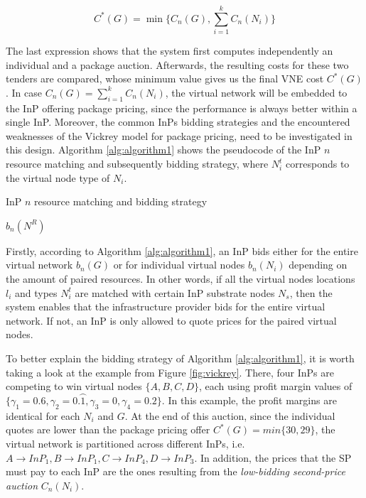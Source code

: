   \begin{equation} \label{eq:Cmcost}
        	C^{*}(G) = \min\{C_n(G), \sum_{i=1}^{k} C_n(N_i)\}
  \end{equation}

The last expression shows that the system first computes independently an individual and a package auction. Afterwards, the resulting costs for these two tenders are compared, whose minimum value gives us the final VNE cost $C^{*}(G)$. In case $C_n(G) = \sum_{i=1}^{k} C_n(N_i)$, the virtual network will be embedded to the InP offering package pricing, since the performance is always better within a single InP. Moreover, the common InPs bidding strategies and the encountered weaknesses of the Vickrey model for package pricing, need to be investigated in this design. Algorithm \ref{alg:algorithm1} shows the pseudocode of the InP $n$ resource matching and subsequently bidding strategy, where $N^{t}_i$ corresponds to the virtual node type of $N_i$.


 \begin{algorithm}
  \caption{InP $n$ resource matching and bidding strategy}
 \label{alg:algorithm1}
  \begin{algorithmic}[1]
 \ELSE
 	 \ENDIF
 	\ENDFOR
 	\State \Return $b_n(N^{R})$
 \ENDIF
 \end{algorithmic}
\end{algorithm}

Firstly, according to Algorithm \ref{alg:algorithm1}, an InP bids either for the entire virtual network $b_n(G)$ or for individual virtual nodes $b_n(N_i)$ depending on the amount of paired resources. In other words, if all the virtual nodes locations $l_{i}$ and types $N^{t}_i$ are matched with certain InP substrate nodes $N_s$, then the system enables that the infrastructure provider bids for the entire virtual network. If not, an InP is only allowed to quote prices for the paired virtual nodes.

To better explain the bidding strategy of Algorithm \ref{alg:algorithm1}, it is worth taking a look at the example from Figure \ref{fig:vickrey}. There, four InPs are competing to win virtual nodes $\{A,B,C,D\}$, each using profit margin values of $\{\gamma_1 = 0.6,\gamma_2 = 0.\wideparen{1},\gamma_3 = 0,\gamma_4 = 0.2\}$. In this example, the profit margins are identical for each $N_i$ and $G$. At the end of this auction, since the individual quotes are lower than the package pricing offer $C^{*}(G) = min\{30, 29\}$, the virtual network is partitioned across different InPs, i.e. $A \rightarrow InP_1, B \rightarrow InP_1, C \rightarrow InP_4, D \rightarrow InP_3$.  In addition, the prices that the SP must pay to each InP are the ones resulting from the \textit{low-bidding second-price auction} $C_n(N_i)$. 

